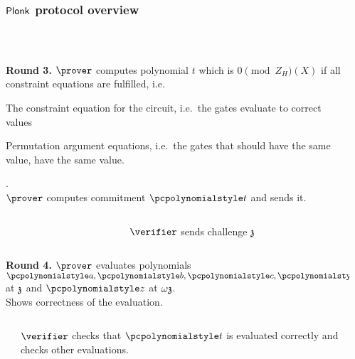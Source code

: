 \documentclass[aspectratio=169,handout]{beamer}
\renewcommand{\myskip}{0.5\baselineskip}
\begin{document}
\begin{frame}
\end{frame}

  \begin{frame}[t]
    \frametitle{$\textnormal{\textsf{Plonk}}$ protocol overview}
    \\[\myskip]
  
  \begin{columns}
    \begin{column}{0.5\linewidth}
      \textbf{Round 3.} $\prover$ computes polynomial $t$ which is $0 \pmod
      Z_H(X)$ if all constraint equations are fulfilled, i.e.~
    \begin{compactitem}
    \item The constraint equation for the circuit, i.e.~the gates evaluate to
      correct values
    \item Permutation argument equations, i.e.~the gates that should have the
      same value, have the same value.
    \end{compactitem}
    .\\
    $\prover$ computes commitment $\p{t}$ and sends it.
  \end{column}
  \begin{column}{0.5\linewidth}
  \end{column}
\end{columns}
\begin{columns}
  \begin{column}{0.5\linewidth}
  \end{column}
  \begin{column}{0.5\linewidth}
    $\verifier$ sends challenge $\mathfrak{z}$
  \end{column}
\end{columns}
 \begin{columns}
    \begin{column}{0.5\linewidth}
      \textbf{Round 4.} $\prover$ evaluates polynomials $\p{a}, \p{b}, \p{c},
      \p{t}$ at $\mathfrak{z}$ and $\p{z}$ at $\omega \mathfrak{z}$.\\
      Shows correctness of the evaluation.
    \end{column}
    \begin{column}{0.5\linewidth}
    \end{column}
  \end{columns}
  \begin{columns}
    \begin{column}{0.5\linewidth}
    \end{column}
    \begin{column}{0.5\linewidth}
      $\verifier$ checks that $\p{t}$ is evaluated correctly and checks other
      evaluations.
    \end{column}
  \end{columns}
\end{frame}
\end{document}
